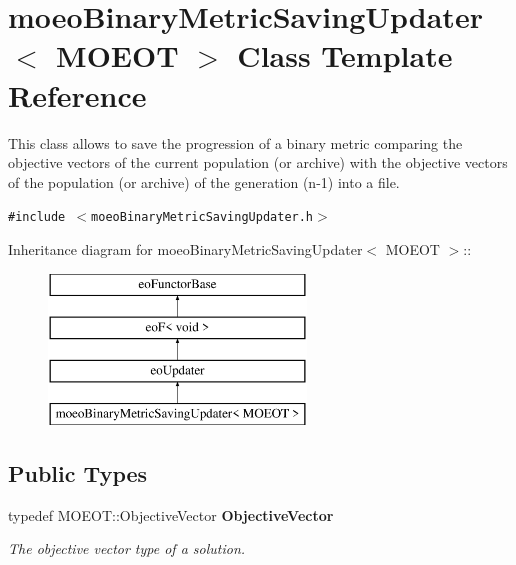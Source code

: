 \section{moeo\-Binary\-Metric\-Saving\-Updater$<$ MOEOT $>$ Class Template Reference}
\label{classmoeoBinaryMetricSavingUpdater}
This class allows to save the progression of a binary metric comparing the objective vectors of the current population (or archive) with the objective vectors of the population (or archive) of the generation (n-1) into a file.  


{\tt \#include $<$moeo\-Binary\-Metric\-Saving\-Updater.h$>$}

Inheritance diagram for moeo\-Binary\-Metric\-Saving\-Updater$<$ MOEOT $>$::\begin{figure}[H]
\begin{center}
\leavevmode
\includegraphics[height=4cm]{classmoeoBinaryMetricSavingUpdater}
\end{center}
\end{figure}
\subsection*{Public Types}
\begin{CompactItemize}
\item 
typedef MOEOT::Objective\-Vector {\bf Objective\-Vector}\label{classmoeoBinaryMetricSavingUpdater_21c2b12ee8600d8550eff42bcba87fd2}

\begin{CompactList}\small\item\em The objective vector type of a solution. \item\end{CompactList}\end{CompactItemize}
